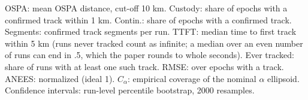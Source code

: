 \begin{table}[!htbp]
\smallskip
\parbox{\textwidth}{\footnotesize OSPA: mean OSPA distance, cut-off 10 km. Custody: share of epochs with a confirmed track within 1 km. Contin.: share of epochs with a confirmed track. Segments: confirmed track segments per run. TTFT: median time to first track within 5 km (runs never tracked count as infinite; a median over an even number of runs can end in .5, which the paper rounds to whole seconds). Ever tracked: share of runs with at least one such track. RMSE: over epochs with a track. ANEES: normalized (ideal 1). $C_\alpha$: empirical coverage of the nominal $\alpha$ ellipsoid. Confidence intervals: run-level percentile bootstrap, 2000 resamples.}
\end{table}
